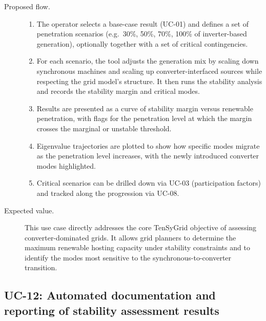 \begin{description}
  \item[Proposed flow.]
        \begin{enumerate}[before=\leavevmode, leftmargin=*]
          \item The operator selects a base-case result (UC-01) and defines a set of penetration scenarios (e.g.\ 30\%, 50\%, 70\%, 100\% of inverter-based generation), optionally together with a set of critical contingencies.
          \item For each scenario, the tool adjusts the generation mix by scaling down synchronous machines and scaling up converter-interfaced sources while respecting the grid model's structure. It then runs the stability analysis and records the stability margin and critical modes.
          \item Results are presented as a curve of stability margin versus renewable penetration, with flags for the penetration level at which the margin crosses the marginal or unstable threshold.
          \item Eigenvalue trajectories are plotted to show how specific modes migrate as the penetration level increases, with the newly introduced converter modes highlighted.
          \item Critical scenarios can be drilled down via UC-03 (participation factors) and tracked along the progression via UC-08.
        \end{enumerate}
  \item[Expected value.] This use case directly addresses the core TenSyGrid objective of assessing converter-dominated grids. It allows grid planners to determine the maximum renewable hosting capacity under stability constraints and to identify the modes most sensitive to the synchronous-to-converter transition.
\end{description}

\subsection{UC-12: Automated documentation and reporting of stability assessment results}

